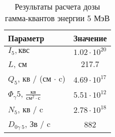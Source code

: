 \begin{table}[H]
	\caption{Результаты расчета дозы гамма-квантов энергии 5 МэВ}
	\begin{center}
        \begin{tabular}{|l|c|}
        \toprule
         Параметр & Значение \\
         \midrule
         \hline
         $I_5, \text{кв}{с}$ & $1.02 \cdot 10^{20}$ \\
         \hline
         $L$, см & 217.7 \\
         \hline
         $Q_5$, кв / (см $\cdot$ c)  & $4.69 \cdot 10^{17}$ \\
         \hline
         $\Phi_\gamma 5$, $\frac{\text{кв}}{\text{см}^2 \cdot \text{с}}$ & $5.51 \cdot 10^{12}$ \\ 
         \hline
         $N_5$, кв / c & $2.78 \cdot 10^{18}$ \\ 
         \hline
         $D_{0\gamma\ 5}$, Зв / c & 882\\
         \hline
         \bottomrule
		\end{tabular}
		\label{tabular:bio_sec_3_out_5}
	\end{center}
\end{table}

